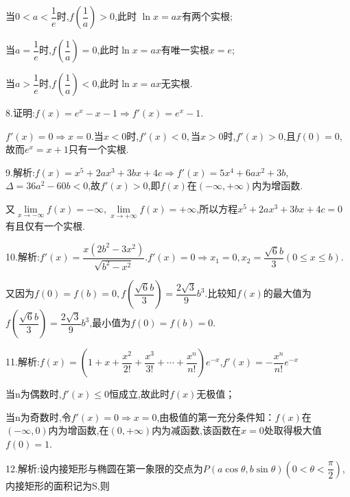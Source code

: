 当$0 < a < \dfrac{1}{e}$时,$f\left( {\dfrac{1}{a}} \right) > 0$,此时
$\ln x = ax$有两个实根;

当$a = \dfrac{1}{e}$时,$f\left( {\dfrac{1}{a}} \right) = 0$,此时$\ln x = ax$有唯一实根$x = e$;

当$a > \dfrac{1}{e}$时,$f\left( {\dfrac{1}{a}} \right) < 0$,此时$\ln x = ax$无实根.

8.证明:$f\left( x \right) = {e^x} - x - 1 \Rightarrow f'\left( x \right) = {e^x} - 1.$

$f'\left( x \right) = 0 \Rightarrow x = 0.$当$x < 0$时,$f'\left( x \right) < 0,$当$x > 0$时,$f'\left( x \right) > 0$,且$f\left( 0 \right) = 0,$故而$e^x = x + 1$只有一个实根.

9.解析:$f\left( x \right) = {x^5} + 2a{x^3} + 3bx + 4c \Rightarrow f'\left( x \right) = 5{x^4} + 6a{x^2} + 3b$,$\Delta  = 36{a^2} - 60b < 0$,故$f'\left( x \right) > 0$,即$f\left( x \right)$在$\left( { - \infty , + \infty } \right)$内为增函数.

又$\mathop {\lim }\limits_{x \to  - \infty } f\left( x \right) =  - \infty ,\lim\limits_{x \to +\infty}  f\left( x \right) =  + \infty $,所以方程${x^5} + 2a{x^3} + 3bx + 4c = 0$有且仅有一个实根.

10.解析:$f'\left( x \right) = \dfrac{{x\left( {2{b^2} - 3{x^2}} \right)}}{{\sqrt {{b^2} - {x^2}} }}.f'\left( x \right) = 0 \Rightarrow {x_1} = 0,{x_2} = \dfrac{{\sqrt 6 b}}{3}\left( {0 \le x \le b} \right)$.

又因为$f\left( 0 \right) = f\left( b \right) = 0,f\left( {\dfrac{{\sqrt 6 b}}{3}} \right) = \dfrac{{2\sqrt 3 }}{9}{b^3}$.比较知$f\left( x \right)$的最大值为$f\left( {\dfrac{{\sqrt 6 b}}{3}} \right) = \dfrac{{2\sqrt 3 }}{9}{b^3}$,最小值为$f\left( 0 \right) = f\left( b \right) = 0$.

11.解析:$f\left( x \right) = \left( {1 + x + \dfrac{{{x^2}}}{{2!}} + \dfrac{{{x^3}}}{{3!}} +  \cdots  + \dfrac{{{x^n}}}{{n!}}} \right){e^{ - x}}$,$f'\left( x \right) =  - \dfrac{{{x^n}}}{{n!}}{e^{ - x}}$

当n为偶数时,$f'\left( x \right) \le 0$恒成立,故此时$f\left( x \right)$无极值；

当n为奇数时,令$f'\left( x \right) = 0 \Rightarrow x = 0$,由极值的第一充分条件知：$f\left( x \right)$在$\left( { - \infty ,0} \right)$内为增函数,在$\left( {0, + \infty } \right)$内为减函数,该函数在$x = 0$处取得极大值$f\left( 0 \right) = 1$.

12.解析:设内接矩形与椭圆在第一象限的交点为$P\left( {a\cos \theta ,b\sin \theta } \right)$$\left( {0 < \theta  < \dfrac{\pi }{2}} \right)$,内接矩形的面积记为S,则

